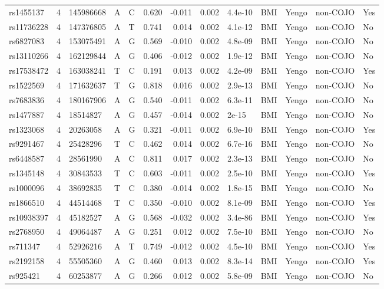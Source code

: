 \documentclass[11pt,twoside]{bristolthesis}
\begin{document}
\begin{longtable}[t]{lrlllrrrlllll}
rs1455137 & 4 & 145986668 & A & C & 0.620 & -0.011 & 0.002 & 4.4e-10 & BMI & Yengo & non-COJO & Yes\\
rs11736228 & 4 & 147376805 & A & T & 0.741 & 0.014 & 0.002 & 4.1e-12 & BMI & Yengo & non-COJO & No\\
\addlinespace
rs6827083 & 4 & 153075491 & A & G & 0.569 & -0.010 & 0.002 & 4.8e-09 & BMI & Yengo & non-COJO & No\\
rs13110266 & 4 & 162129844 & A & G & 0.406 & -0.012 & 0.002 & 1.9e-12 & BMI & Yengo & non-COJO & No\\
rs17538472 & 4 & 163038241 & T & C & 0.191 & 0.013 & 0.002 & 4.2e-09 & BMI & Yengo & non-COJO & Yes\\
rs1522569 & 4 & 171632637 & T & G & 0.818 & 0.016 & 0.002 & 2.9e-13 & BMI & Yengo & non-COJO & No\\
rs7683836 & 4 & 180167906 & A & G & 0.540 & -0.011 & 0.002 & 6.3e-11 & BMI & Yengo & non-COJO & No\\
\addlinespace
rs1477887 & 4 & 18514827 & A & G & 0.457 & -0.014 & 0.002 & 2e-15 & BMI & Yengo & non-COJO & No\\
rs1323068 & 4 & 20263058 & A & G & 0.321 & -0.011 & 0.002 & 6.9e-10 & BMI & Yengo & non-COJO & Yes\\
rs9291467 & 4 & 25428296 & T & C & 0.462 & 0.014 & 0.002 & 6.7e-16 & BMI & Yengo & non-COJO & No\\
rs6448587 & 4 & 28561990 & A & C & 0.811 & 0.017 & 0.002 & 2.3e-13 & BMI & Yengo & non-COJO & No\\
rs1345148 & 4 & 30843533 & T & C & 0.603 & -0.011 & 0.002 & 2.5e-10 & BMI & Yengo & non-COJO & Yes\\
\addlinespace
rs1000096 & 4 & 38692835 & T & C & 0.380 & -0.014 & 0.002 & 1.8e-15 & BMI & Yengo & non-COJO & No\\
rs1866510 & 4 & 44514468 & T & C & 0.350 & -0.010 & 0.002 & 8.1e-09 & BMI & Yengo & non-COJO & Yes\\
rs10938397 & 4 & 45182527 & A & G & 0.568 & -0.032 & 0.002 & 3.4e-86 & BMI & Yengo & non-COJO & Yes\\
rs2768950 & 4 & 49064487 & A & G & 0.251 & 0.012 & 0.002 & 7.5e-10 & BMI & Yengo & non-COJO & No\\
rs711347 & 4 & 52926216 & A & T & 0.749 & -0.012 & 0.002 & 4.5e-10 & BMI & Yengo & non-COJO & Yes\\
\addlinespace
rs2192158 & 4 & 55505360 & A & G & 0.460 & 0.013 & 0.002 & 8.3e-14 & BMI & Yengo & non-COJO & Yes\\
rs925421 & 4 & 60253877 & A & G & 0.266 & 0.012 & 0.002 & 5.8e-09 & BMI & Yengo & non-COJO & No\\

\end{longtable}
\end{document}
